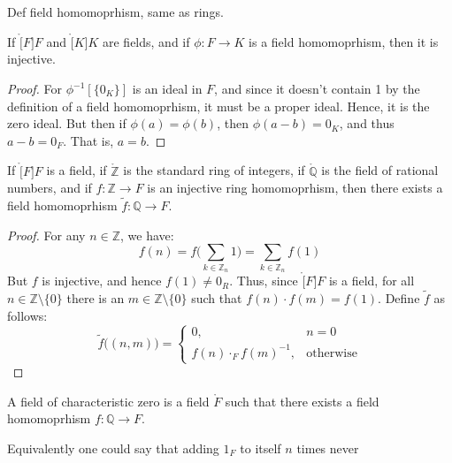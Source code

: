     Def field homomoprhism, same as rings.
    \begin{theorem}
        If $\ring[F]{F}$ and $\ring[K]{K}$ are fields, and if
        $\phi:F\rightarrow{K}$ is a field homomoprhism, then it is
        injective.
    \end{theorem}
    \begin{proof}
        For $\phi^{\minus{1}}[\{0_{K}\}]$ is an ideal in $F$, and since it
        doesn't contain 1 by the definition of a field homomoprhism, it
        must be a proper ideal. Hence, it is the zero ideal. But then if
        $\phi(a)=\phi(b)$, then $\phi(a-b)=0_{K}$, and thus $a-b=0_{F}$.
        That is, $a=b$.
    \end{proof}
    \begin{theorem}
        If $\ring[F]{F}$ is a field, if $\ring{\mathbb{Z}}$ is the standard
        ring of integers, if $\ring{\mathbb{Q}}$ is the field of
        rational numbers, and if $f:\mathbb{Z}\rightarrow{F}$ is an
        injective ring homomoprhism, then there exists a field homomoprhism
        $\tilde{f}:\mathbb{Q}\rightarrow{F}$.
    \end{theorem}
    \begin{proof}
        For any $n\in\mathbb{Z}$, we have:
        \begin{equation}
            f(n)=f\Big(\sum_{k\in\mathbb{Z}_{n}}1\Big)
            =\sum_{k\in\mathbb{Z}_{n}}f(1)
        \end{equation}
        But $f$ is injective, and hence $f(1)\ne{0}_{R}$. Thus, since
        $\ring[F]{F}$ is a field, for all $n\in\mathbb{Z}\setminus\{0\}$
        there is an $m\in\mathbb{Z}\setminus\{0\}$ such that
        $f(n)\cdot{f}(m)=f(1)$. Define $\tilde{f}$ as follows:
        \begin{equation}
            \tilde{f}\big((n,m)\big)=
            \begin{cases}
                0,&n=0\\
                f(n)\cdot_{F}f(m)^{\minus{1}},&\textrm{otherwise}
            \end{cases}
        \end{equation}
    \end{proof}
    \begin{definition}
        A field of characteristic zero is a field $\ring{F}$ such that there
        exists a field homomoprhism $f:\mathbb{Q}\rightarrow{F}$.
    \end{definition}
    Equivalently one could say that adding $1_{F}$ to itself $n$ times never
